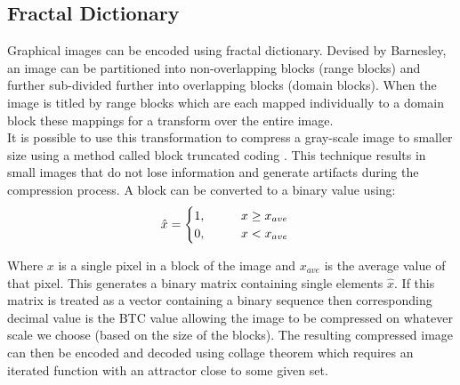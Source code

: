 \documentclass[12pt]{article}
\begin{document}
\subsection{Fractal Dictionary}
{\parindent0pt
Graphical images can be encoded using fractal dictionary.\cite{china} Devised by Barnesley, an image can be partitioned into non-overlapping blocks (range blocks) and  further sub-divided further into overlapping blocks (domain blocks). When the image is titled by range blocks which are each mapped individually to a domain block these mappings for a transform over the entire image. \\

It is possible to use this transformation to compress a gray-scale image to smaller size using a method called block truncated coding \cite{china}. This technique results in small images that do not lose information and generate artifacts during the compression process. A block can be converted to a binary value using:
\begin{align*}
\hat{x} = 
\begin{cases}
1, \hspace{10mm} x \ge x_{ave}\\
0, \hspace{10mm} x <  x_{ave}
\end{cases}
\end{align*}

Where $x$ is a single pixel in a block of the image and $x_{ave}$ is the average value of that pixel. This generates a binary matrix containing single elements $\hat{x}$. If this matrix is treated as a vector containing a binary sequence then corresponding decimal value is the BTC value allowing the image to be compressed on whatever scale we choose (based on the size of the blocks). The resulting compressed image can then be encoded and decoded using collage theorem\cite{iraq} which requires an iterated function with an attractor close to some given set.

}
\end{document}
